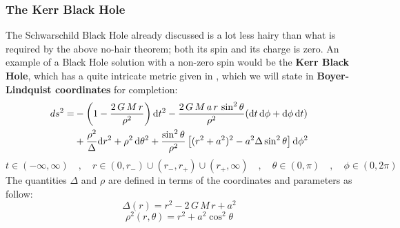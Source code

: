 \subsubsection{The Kerr Black Hole}
The Schwarschild Black Hole already discussed is a lot less hairy than what is required by the above no-hair theorem; both its spin and its charge is zero. An example of a Black Hole solution with a non-zero spin would be the \textbf{Kerr Black Hole}, which has a quite intricate metric given in \cite{GR}, which we will state in \textbf{Boyer-Lindquist coordinates} for completion:
%
%
\begin{align}\label{kerr_metric}
ds^2 = & - \left( 1 - \frac{2 \, G \, M \, r}{\rho^2} \right) \mathrm{d}t^2
- \frac{2 \, G \, M \, a \, r \, \sin^2\theta}{\rho^2}
(\mathrm{d}t \, \mathrm{d}\phi + \mathrm{d}\phi \, \mathrm{d}t) \notag\\
& + \frac{\rho^2}{\Delta}\mathrm{d}r^2
+ \rho^2 \, \mathrm{d}\theta^2
+ \frac{\sin^2\theta}{\rho^2} \left[
(r^2 + a^2)^2 - a^2 \Delta \sin^2{\theta}
\right] \mathrm{d}\phi^2
\end{align}
%
\begin{equation}
t \in (-\infty, \infty)
\quad , \quad
r \in (0, r_-) \cup (r_-, r_+) \cup (r_+, \infty)
\quad , \quad
\theta \in (0, \pi)
\quad , \quad
\phi \in (0, 2 \pi)
\end{equation}
%
%
The quantities $\Delta$ and $\rho$ are defined in terms of the coordinates and parameters as follow:
%
%
\begin{equation}
\Delta(r) = r^2 - 2 \, G \, M \, r + a^2
\end{equation}
%
\begin{equation}
\rho^2(r,\theta) = r^2 + a^2 \cos^2{\theta}
\end{equation}
%
%

